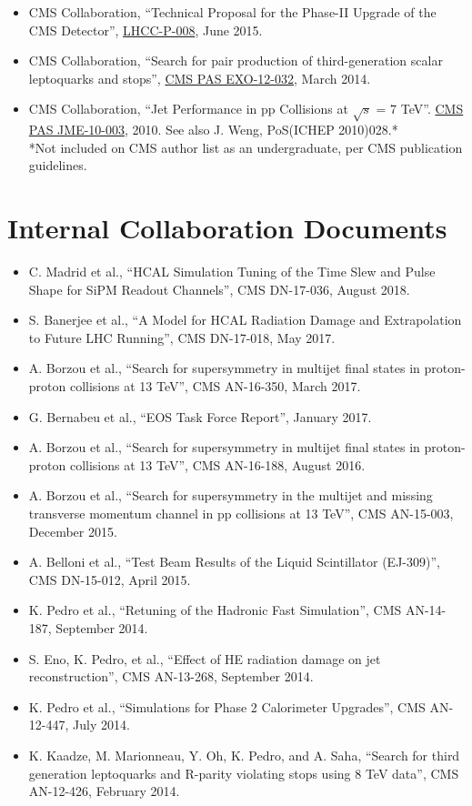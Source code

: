 \begin{itemize}[leftmargin=12pt]
\fi
\item CMS Collaboration, ``Technical Proposal for the Phase-II Upgrade of the CMS Detector'', \href{http://cds.cern.ch/record/2020886}{LHCC-P-008}, June 2015.
\ifdefined\longestflag
\item CMS Collaboration, ``Search for pair production of third-generation scalar leptoquarks and stops'', \href{https://cds.cern.ch/record/1668411}{CMS PAS EXO-12-032}, March 2014.
\item CMS Collaboration, ``Jet Performance in pp Collisions at $\sqrt{s}$ = 7 TeV''. \href{http://cds.cern.ch/record/1279362}{CMS PAS JME-10-003}, 2010. See also J. Weng, PoS(ICHEP 2010)028.*\\
\small{*Not included on CMS author list as an undergraduate, per CMS publication guidelines.}
\fi
\end{itemize}

\ifdefined\longerflag
\section{Internal Collaboration Documents}
\begin{itemize}[leftmargin=12pt]
\item C. Madrid et al., ``HCAL Simulation Tuning of the Time Slew and Pulse Shape for SiPM Readout Channels'', CMS DN-17-036, August 2018.
\item S. Banerjee et al., ``A Model for HCAL Radiation Damage and Extrapolation to Future LHC Running'', CMS DN-17-018, May 2017.
\ifdefined\longestflag
\item A. Borzou et al., ``Search for supersymmetry in multijet final states in proton-proton collisions at 13 TeV'', CMS AN-16-350, March 2017.
\fi
\item G. Bernabeu et al., ``EOS Task Force Report'', January 2017.
\ifdefined\longestflag
\item A. Borzou et al., ``Search for supersymmetry in multijet final states in proton-proton collisions at 13 TeV'', CMS AN-16-188, August 2016.
\item A. Borzou et al., ``Search for supersymmetry in the multijet and missing transverse momentum channel in pp collisions at 13 TeV'', CMS AN-15-003, December 2015.
\fi
\item A. Belloni et al., ``Test Beam Results of the Liquid Scintillator (EJ-309)'', CMS DN-15-012, April 2015.
\item K. Pedro et al., ``Retuning of the Hadronic Fast Simulation'', CMS AN-14-187, September 2014.
\item S. Eno, K. Pedro, et al., ``Effect of HE radiation damage on jet reconstruction'', CMS AN-13-268, September 2014.
\item K. Pedro et al., ``Simulations for Phase 2 Calorimeter Upgrades'', CMS AN-12-447, July 2014.
\ifdefined\longestflag
\item K. Kaadze, M. Marionneau, Y. Oh, K. Pedro, and A. Saha, ``Search for third generation leptoquarks and R-parity violating stops using 8 TeV data'', CMS AN-12-426, February 2014.
\fi
\end{itemize}
\fi